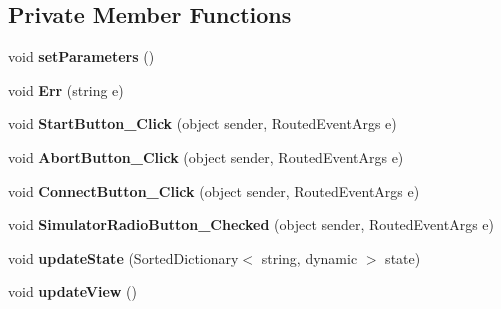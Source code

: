 \subsection*{Private Member Functions}
\begin{DoxyCompactItemize}
\item 
\mbox{\label{class_a_s_e6030_1_1_main_window_a3d5fad3a2b1028ab274a65a9beefd608}} 
void {\bfseries set\+Parameters} ()
\item 
\mbox{\label{class_a_s_e6030_1_1_main_window_ace6840767bfc4469c5f4571d9605b5f6}} 
void {\bfseries Err} (string e)
\item 
\mbox{\label{class_a_s_e6030_1_1_main_window_a0fdb876c1210d2f9d5092171da0e96dd}} 
void {\bfseries Start\+Button\+\_\+\+Click} (object sender, Routed\+Event\+Args e)
\item 
\mbox{\label{class_a_s_e6030_1_1_main_window_a3f5f58bf9603fa994e7501b10cbf7d97}} 
void {\bfseries Abort\+Button\+\_\+\+Click} (object sender, Routed\+Event\+Args e)
\item 
\mbox{\label{class_a_s_e6030_1_1_main_window_aafd537e91cef65c5f1206de37ec82433}} 
void {\bfseries Connect\+Button\+\_\+\+Click} (object sender, Routed\+Event\+Args e)
\item 
\mbox{\label{class_a_s_e6030_1_1_main_window_aedac51ed593438f7c9e834f86310b16d}} 
void {\bfseries Simulator\+Radio\+Button\+\_\+\+Checked} (object sender, Routed\+Event\+Args e)
\item 
\mbox{\label{class_a_s_e6030_1_1_main_window_afb968f7e70b4e02f70ed61cdd3b6d12b}} 
void {\bfseries update\+State} (Sorted\+Dictionary$<$ string, dynamic $>$ state)
\item 
\mbox{\label{class_a_s_e6030_1_1_main_window_a7f00ab98e7c44c2d97e196593aec4e5c}} 
void {\bfseries update\+View} ()
\item 
\mbox{\label{class_a_s_e6030_1_1_main_window_a447cb8531e21b4c80ff7021c6e747a23}} 

\end{DoxyCompactItemize}
